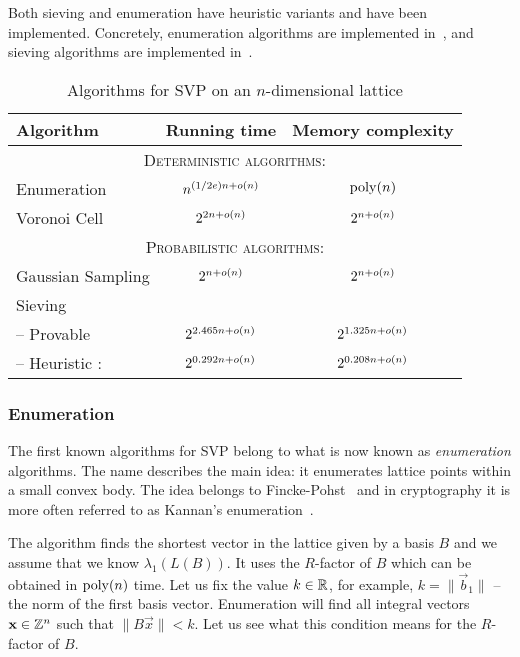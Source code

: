 Both sieving and enumeration have heuristic variants  and have been implemented. Concretely,  enumeration algorithms are implemented in~\cite{fpylll}, and sieving algorithms are implemented in~\cite{g6k}. 

{
\renewcommand\arraystretch{1.4}
\begin{table}[h]
	\centering
	\begin{tabular}{| l | c | c |}
		\hline
		\textbf{Algorithm} & \textbf{Running time} & \textbf{Memory complexity} \\ \hline
		\multicolumn{3}{|c|}{\textsc{ Deterministic algorithms:} } \\ \hline
		Enumeration \cite{Kan83,HanSte07} & $n^{ (1/2e) n + o(n)}$ & $\operatorname{poly}(n)$ \\ \hline
		Voronoi Cell \cite{MicVou10} & $2^{2n + o(n)}$ & $2^{n+o(n)}$ \\ \hline
		\multicolumn{3}{|c|}{\textsc{ Probabilistic algorithms:} } \\ \hline
		Gaussian Sampling \cite{ADRS15} & $2^{n+ o(n)}$ & $2^{n+ o(n)}$ \\ \hline
		Sieving \cite{AKS01} & & \\ [-1ex]
		\hspace{5pt} -- Provable \cite{PS09} & $2^{2.465n + o(n)}$& $2^{1.325n + o(n)}$ \\ [-1ex]
		\hspace{5pt} -- Heuristic \cite{BDGL16}: & $2^{0.292n + o(n)}$ & $2^{0.208n + o(n)}$  \\  \hline
	\end{tabular}
	\caption[Algorithms for SVP]{Algorithms for SVP on an $n$-dimensional lattice} 
	
	\label{table:SVPAlgs}
\end{table} 

}
\subsubsection{Enumeration}

The first known algorithms for SVP belong to what is now known as \emph{enumeration} algorithms. The name describes the main idea: it enumerates lattice points within a small convex body. The idea belongs to Fincke-Pohst~\cite{FP83} and in cryptography it is more often referred to as Kannan's enumeration~\cite{Kan83}. 

The algorithm finds the shortest vector in the lattice given by a basis $B$ and we assume that we know $\lambda_1(L(B))$. It uses the $R$-factor of $B$ which can be obtained in $\operatorname{poly}(n)$ time. Let us fix the value $k \in \mathbb{R}$, for example, $k = \| \vec b_1 \|$ -- the norm of the first basis vector. Enumeration will find all integral vectors $\mathbf x \in \mathbb{Z}^n$ such that $\|B\vec x \| < k$. Let us see what this condition means for the $R$-factor of $B$.

